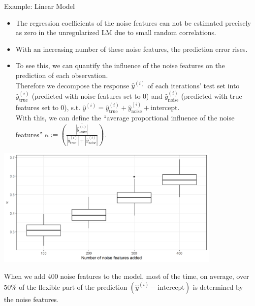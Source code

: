 \documentclass[11pt,compress,t,notes=noshow, xcolor=table]{beamer}
\begin{document}
\begin{vbframe}{Example: Linear Model}
\framebreak
\begin{itemize}
\item The regression coefficients of the noise features can not be estimated precisely as zero in the unregularized LM due to small random correlations. 
\item With an increasing number of these noise features, the prediction error rises.
\item To see this, we can quantify the influence of the noise features on the prediction of each observation. \\ 
Therefore we decompose the response $\hat y^{(i)}$ of each iterations' test set into $\hat y^{(i)}_{\text{true}}$ (predicted with noise features set to 0) and $\hat y^{(i)}_{\text{noise}}$ (predicted with true features set to 0), s.t. $\hat y^{(i)} =  \hat y^{(i)}_{\text{true}} + \hat y^{(i)}_{\text{noise}} + \text{intercept}$. \\
With this, we can define the \enquote{average proportional influence of the noise features} $\kappa := \overline{\left( \frac{|\hat y^{(i)}_{\text{noise}}|}{|\hat y^{(i)}_{\text{true}}| + |\hat y^{(i)}_{\text{noise}}|} \right)}$.

\end{itemize}
\framebreak

\begin{center}
\includegraphics[width = 11cm ]{figure/lm_noise_plot.png}
\end{center}

When we add 400 noise features to the model, most of the time, on average, over $50\%$ of the flexible part of the prediction $(\hat y^{(i)} - \text{intercept})$ is determined by the noise features.

\end{vbframe} 
\end{document}
